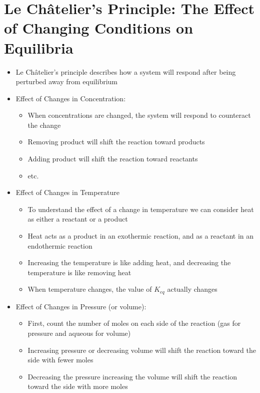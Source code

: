 \documentclass[12pt, openany, letterpaper]{memoir}
\begin{document}
\section{Le Ch\^atelier's Principle: The Effect of Changing Conditions on Equilibria}
\begin{itemize}
	\item Le Ch\^atelier's principle describes how a system will respond after being perturbed away from equilibrium
	\item Effect of Changes in Concentration:
	      \begin{itemize}
		      \item When concentrations are changed, the system will respond to counteract the change
		      \item Removing product will shift the reaction toward products
		      \item Adding product will shift the reaction toward reactants
		      \item etc.
	      \end{itemize}
	\item Effect of Changes in Temperature
	      \begin{itemize}
		      \item To understand the effect of a change in temperature we can consider heat as either a reactant or a product
		      \item Heat acts as a product in an exothermic reaction, and as a reactant in an endothermic reaction
		      \item Increasing the temperature is like adding heat, and decreasing the temperature is like removing heat
		      \item When temperature changes, the value of $K_{eq}$ actually changes
	      \end{itemize}
	\item Effect of Changes in Pressure (or volume):
	      \begin{itemize}
		      \item First, count the number of moles on each side of the reaction (gas for pressure and aqueous for volume)
		      \item Increasing pressure or decreasing volume will shift the reaction toward the side with fewer moles
		      \item Decreasing the pressure increasing the volume will shift the reaction toward the side with more moles
	      \end{itemize}
\end{itemize}
\end{document}
